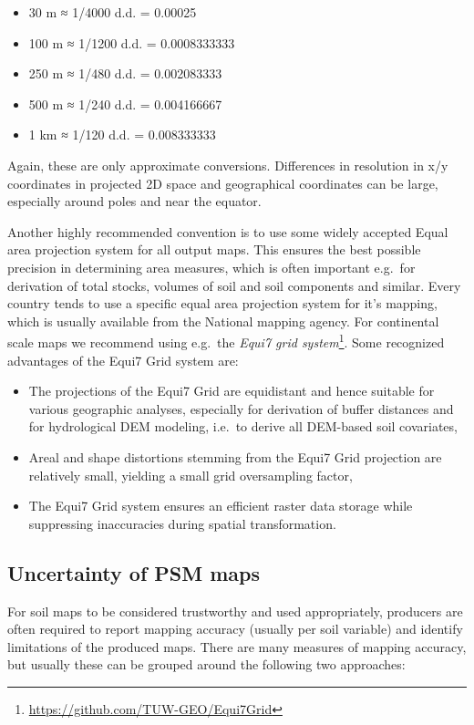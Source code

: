 \documentclass[graybox,natbib,nospthms,UStrade]{svmono}
\renewcommand{\href}[2]{#2 (\url{#1})}
\renewcommand{\href}[2]{#2\footnote{\url{#1}}}
\begin{document}
\begin{itemize}
\item
  30 m ≈ 1/4000 d.d. = 0.00025
\item
  100 m ≈ 1/1200 d.d. = 0.0008333333
\item
  250 m ≈ 1/480 d.d. = 0.002083333
\item
  500 m ≈ 1/240 d.d. = 0.004166667
\item
  1 km ≈ 1/120 d.d. = 0.008333333
\end{itemize}

Again, these are only approximate conversions. Differences in resolution
in x/y coordinates in projected 2D space and geographical coordinates
can be large, especially around poles and near the equator.

Another highly recommended convention is to use some widely accepted
Equal area projection system for all output maps. This ensures the best
possible precision in determining area measures, which is often
important e.g.~for derivation of total stocks, volumes of soil and soil
components and similar. Every country tends to use a specific equal area
projection system for it's mapping, which is usually available from the
National mapping agency. For continental scale maps we recommend using
e.g.~the \href{https://github.com/TUW-GEO/Equi7Grid}{\emph{Equi7 grid system}}.
Some recognized advantages of the Equi7 Grid system are:

\begin{itemize}
\item
  The projections of the Equi7 Grid are equidistant and hence suitable
  for various geographic analyses, especially for derivation of
  buffer distances and for hydrological DEM modeling, i.e.~to derive
  all DEM-based soil covariates,
\item
  Areal and shape distortions stemming from the Equi7 Grid projection
  are relatively small, yielding a small grid oversampling factor,
\item
  The Equi7 Grid system ensures an efficient raster data storage while
  suppressing inaccuracies during spatial transformation.
\end{itemize}

\hypertarget{uncertainty-of-psm-maps}{%
\subsection{Uncertainty of PSM maps}\label{uncertainty-of-psm-maps}}

For soil maps to be considered trustworthy and used appropriately,
producers are often required to report mapping accuracy (usually per
soil variable) and identify limitations of the produced maps.
There are many measures of mapping accuracy, but usually these can be
grouped around the following two approaches:
\end{document}
